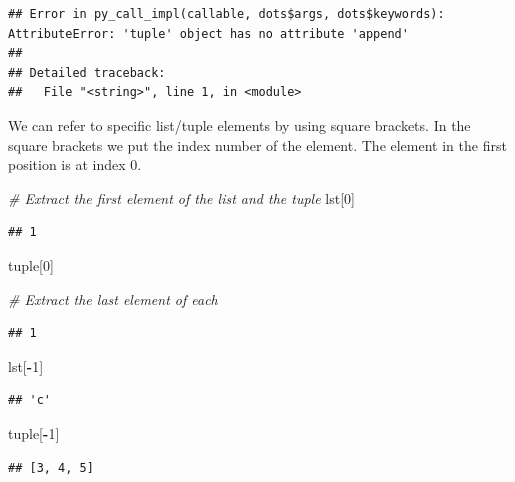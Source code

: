 \documentclass[
]{book}
\newenvironment{Shaded}{\begin{snugshade}}{\end{snugshade}}
\newcommand{\BuiltInTok}[1]{#1}
\newcommand{\CommentTok}[1]{\textcolor[rgb]{0.56,0.35,0.01}{\textit{#1}}}
\newcommand{\DecValTok}[1]{\textcolor[rgb]{0.00,0.00,0.81}{#1}}
\newcommand{\NormalTok}[1]{#1}
\newcommand{\OperatorTok}[1]{\textcolor[rgb]{0.81,0.36,0.00}{\textbf{#1}}}
\begin{document}
\begin{verbatim}
## Error in py_call_impl(callable, dots$args, dots$keywords): AttributeError: 'tuple' object has no attribute 'append'
## 
## Detailed traceback:
##   File "<string>", line 1, in <module>
\end{verbatim}

We can refer to specific list/tuple elements by using square brackets. In the square brackets we put the index number of the element. The element in the first position is at index 0.

\begin{Shaded}
\begin{Highlighting}[]
\CommentTok{\# Extract the first element of the list and the tuple}
\NormalTok{lst[}\DecValTok{0}\NormalTok{]}
\end{Highlighting}
\end{Shaded}

\begin{verbatim}
## 1
\end{verbatim}

\begin{Shaded}
\begin{Highlighting}[]
\BuiltInTok{tuple}\NormalTok{[}\DecValTok{0}\NormalTok{]}

\CommentTok{\# Extract the last element of each }
\end{Highlighting}
\end{Shaded}

\begin{verbatim}
## 1
\end{verbatim}

\begin{Shaded}
\begin{Highlighting}[]
\NormalTok{lst[}\OperatorTok{{-}}\DecValTok{1}\NormalTok{]}
\end{Highlighting}
\end{Shaded}

\begin{verbatim}
## 'c'
\end{verbatim}

\begin{Shaded}
\begin{Highlighting}[]
\BuiltInTok{tuple}\NormalTok{[}\OperatorTok{{-}}\DecValTok{1}\NormalTok{]}
\end{Highlighting}
\end{Shaded}

\begin{verbatim}
## [3, 4, 5]
\end{verbatim}
\end{document}
